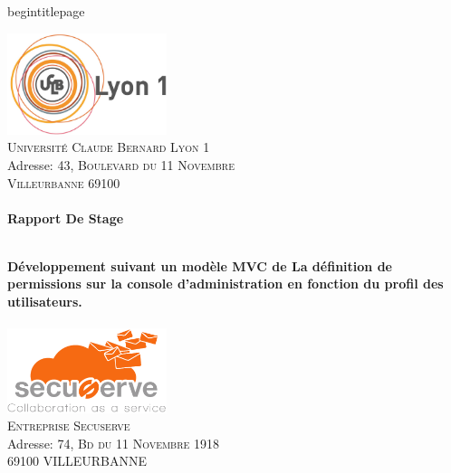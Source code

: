 begin{titlepage}
\begin{center}

\includegraphics[width=0.35\textwidth]{./image/logo_lyon1_2.jpg}~\\[0.2cm]

\textsc{\LARGE Université Claude Bernard Lyon 1}\\
Adresse: \textsc{43, Boulevard du 11 Novembre  \\ Villeurbanne 69100}\\[1cm]

\textsc{\Large }\\[0.5cm]

{\huge \bfseries Rapport De Stage\\}

\HRule \\[0.4cm]

{\huge \bfseries \Large Développement suivant un modèle MVC de La définition de permissions sur la console d'administration en fonction du profil des utilisateurs.} \\[0.4cm]

\HRule \\[1.5cm]

\includegraphics[width=0.35\textwidth]{./image/secuserve_logo.png}~\\[0.2cm]

\textsc{\LARGE Entreprise Secuserve}\\
Adresse: \textsc{74, Bd du 11 Novembre 1918 \\ 69100 VILLEURBANNE}\\[2.5cm]


\end{center}
